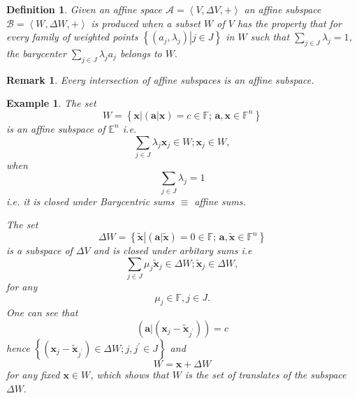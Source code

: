 \documentclass[aps,preprint]{revtex4}%
\newtheorem{definition}[theorem]{Definition}
\newtheorem{example}[theorem]{Example}
\newtheorem{remark}[theorem]{Remark}
\begin{document}
\begin{definition}
Given an affine space $\mathcal{A}=\left\langle V,\Delta V,+\right\rangle $ an
\emph{affine subspace} $\mathcal{B}=\left\langle W,\Delta W,+\right\rangle $
is produced when a subset $W$ of $V$ has the property that for every family of
weighted points $\left\{  \left.  \left(  a_{j},\lambda_{j}\right)
\right\vert j\in J\right\}  $ in $W$ such that $\sum_{j\in J}\lambda_{j}=1$,
the barycenter $\sum_{j\in J}\lambda_{j}a_{j}$ belongs to $W.$
\end{definition}

\begin{remark}
Every intersection of affine subspaces is an affine subspace.
\end{remark}

\begin{example}
The set
\begin{equation}
W=\left\{  \left.  \mathbf{x}\right\vert \left(  \left.  \mathbf{a}\right\vert
\mathbf{x}\right)  =c\in\mathbb{F};\,\mathbf{a,x\in}\mathbb{F}^{n}\right\}
\end{equation}
is an affine subspace of $\mathbb{E}^{n}$ i.e.
\begin{equation}
\sum_{j\in J}\lambda_{j}\mathbf{x}_{j}\in W;\mathbf{x}_{j}\in W,
\end{equation}
when
\begin{equation}
\sum_{j\in J}\lambda_{j}=1
\end{equation}
i.e. it is closed under Barycentric sums $\equiv$ affine sums.

The set
\begin{equation}
\Delta W=\left\{  \left.  \widetilde{\mathbf{x}}\right\vert \left(  \left.
\mathbf{a}\right\vert \widetilde{\mathbf{x}}\right)  =0\in\mathbb{F}%
;\,\mathbf{a,}\widetilde{\mathbf{x}}\mathbf{\in}\mathbb{F}^{n}\right\}
\end{equation}
is a subspace of $\Delta V$ and is closed under arbitary sums i.e
\begin{equation}
\sum_{j\in J}\mu_{j}\widetilde{\mathbf{x}}_{j}\in\Delta
W;\widetilde{\mathbf{x}}_{j}\in\Delta W,
\end{equation}
for any
\begin{equation}
\mu_{j}\in\mathbb{F},j\in J.
\end{equation}
One can see that
\begin{equation}
\left(  \left.  \mathbf{a}\right\vert \left(  \mathbf{x}_{j}%
-\widetilde{\mathbf{x}}_{j^{\prime}}\right)  \right)  =c
\end{equation}
hence $\left\{  \left(  \mathbf{x}_{j}-\widetilde{\mathbf{x}}_{j^{\prime}%
}\right)  \in\Delta W;j,j^{\prime}\in J\right\}  $ and
\begin{equation}
W=\mathbf{x}+\Delta W
\end{equation}
for any fixed $\mathbf{x\in}W$, which shows that $W$ is the set of translates
of the subspace $\Delta W.$
\end{example}
\end{document}
